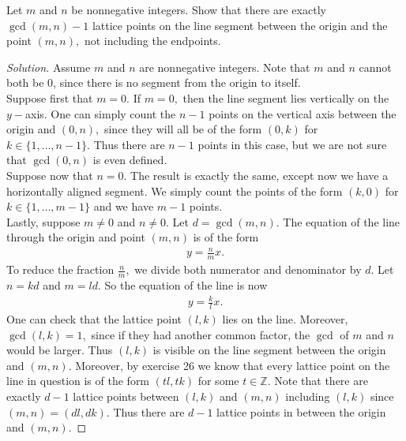 \documentclass[12pt]{article}
\newcommand{\Z}{\mathbb{Z}}
\newenvironment{exercise}[2][Exercise]{\begin{trivlist}
        \item[\hskip \labelsep {\bfseries #1}\hskip \labelsep {\bfseries #2.}]}{\end{trivlist}}
\newenvironment{solution}
        {\begin{proof}[Solution]}
                    {\end{proof}}
\begin{document}
\begin{exercise}{27}
    Let \( m \) and \( n \) be nonnegative integers. Show that there are exactly \( \gcd(m,n ) -1 \) lattice points on the line segment between the origin and the point \( ( m,n ) , \) not including the endpoints.
    \begin{solution}
        Assume \( m \) and \( n \) are nonnegative integers. Note that \( m \) and \( n \) cannot both be 0, since there is no segment from the origin to itself.\\
        Suppose first that \( m = 0. \) If \( m=0, \) then the line segment lies vertically on the \( y- \)axis. One can simply count the \( n-1 \) points on the vertical axis between the origin and \( ( 0,n ) , \) since they will all be of the form \( ( 0,k ) \) for \( k \in \{ 1, \ldots, n-1 \} . \) Thus there are \( n-1 \) points in this case, but we are not sure that \( \gcd(0,n) \) is even defined.\\
        Suppose now that \( n = 0. \) The result is exactly the same, except now we have a horizontally aligned segment. We simply count the points of the form \( ( k, 0 ) \) for \( k \in \{ 1, \ldots, m-1 \} \) and we have \( m-1 \) points.\\
        Lastly, suppose \( m \neq 0 \) and \( n\neq 0. \) Let \( d = \gcd(m,n) . \) The equation of the line through the origin and point \( ( m,n ) \) is of the form
        \begin{align*}
            y = \frac{n}{m} x.
        \end{align*}
        To reduce the fraction \( \frac{n}{m} ,\) we divide both numerator and denominator by \( d \). Let \( n = k d \) and \( m = l d. \) So the equation of the line is now
        \begin{align*}
            y = \frac{k}{l} x.
        \end{align*}
        One can check that the lattice point \( ( l, k ) \) lies on the line. Moreover, \( \gcd(l,k) = 1, \) since if they had another common factor, the \( \gcd \) of \( m \) and \( n \) would be larger. Thus \( ( l, k ) \) is visible on the line segment between the origin and \( ( m,n ) . \) Moreover, by exercise 26 we know that every lattice point on the line in question is of the form \( ( tl,tk )  \) for some \( t \in \Z. \) Note that there are exactly \( d-1 \) lattice points between \( ( l,k ) \) and \( ( m,n ) \) including \( ( l,k ) \) since \( ( m,n ) = ( dl, dk ) . \) Thus there are \( d-1 \) lattice points in between the origin and \( ( m,n ) . \)
    \end{solution}
\end{exercise}
\end{document}
